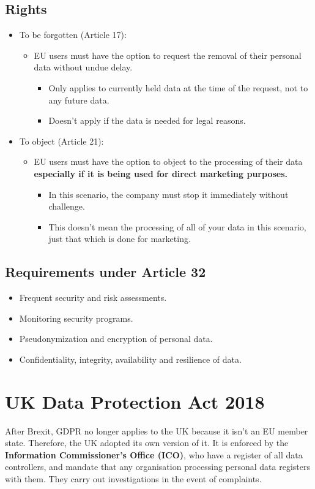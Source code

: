 \documentclass[12pt]{report}
\begin{document}
\subsection{Rights}
\begin{itemize}
	\item To be forgotten \footnotesize (Article 17)\normalsize:
	\begin{itemize}
		\item EU users must have the option to request the removal of their personal data without undue delay.
		\begin{itemize}
			\item Only applies to currently held data at the time of the request, not to any future data.
			\item Doesn't apply if the data is needed for legal reasons.
		\end{itemize}
	\end{itemize}
	\item To object \footnotesize (Article 21)\normalsize:
	\begin{itemize}
		\item EU users must have the option to object to the processing of their data \textbf{especially if it is being used for direct marketing purposes.}
		\begin{itemize}
			\item In this scenario, the company must stop it immediately without challenge.
			\item This doesn't mean the processing of all of your data in this scenario, just that which is done for marketing.
		\end{itemize}
	\end{itemize}
\end{itemize}

\subsection{Requirements under Article 32}
\begin{itemize}
	\item Frequent security and risk assessments.
	\item Monitoring security programs.
	\item Pseudonymization and encryption of personal data.
	\item Confidentiality, integrity, availability and resilience of data.
\end{itemize}

\section{UK Data Protection Act 2018}
After Brexit, GDPR no longer applies to the UK because it isn't an EU member state. Therefore, the UK adopted its own version of it. 
It is enforced by the \textbf{Information Commissioner's Office (ICO)}, who have a register of all data controllers, and mandate that any
organisation processing personal data registers with them. They carry out investigations in the event of complaints.
\end{document}
